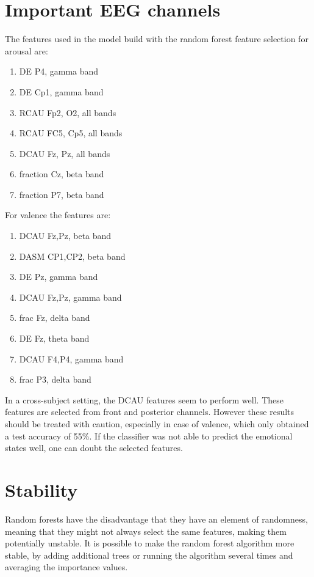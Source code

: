 \section{Important EEG channels}

The features used in the model build with the random forest feature selection for arousal are:
\begin{enumerate}
\item DE P4, gamma band
\item DE Cp1, gamma band
\item RCAU Fp2, O2, all bands
\item RCAU FC5, Cp5, all bands
\item DCAU Fz, Pz, all bands
\item fraction Cz, beta band
\item fraction P7, beta band
\end{enumerate}

For valence the features are:
\begin{enumerate}
\item DCAU Fz,Pz, beta band
\item DASM CP1,CP2, beta band
\item DE Pz, gamma band
\item DCAU Fz,Pz, gamma band
\item frac Fz, delta band
\item DE Fz, theta band
\item DCAU F4,P4, gamma band
\item frac P3, delta band
\end{enumerate}

In a cross-subject setting, the DCAU features seem to perform well. These features are selected from front and posterior channels. However these results should be treated with caution, especially in case of valence, which only obtained a test accuracy of 55\%. If the classifier was not able to predict the emotional states well, one can doubt the selected features. 

\section{Stability}
Random forests have the disadvantage that they have an element of randomness, meaning that they might not always select the same features, making them potentially unstable. It is possible to make the random forest algorithm more stable, by adding additional trees or running the algorithm several times and averaging the importance values. 

